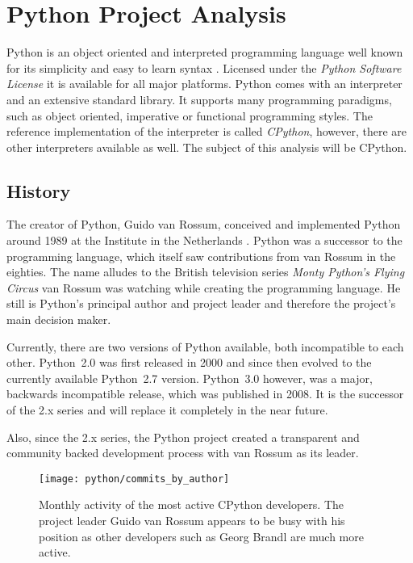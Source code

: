 \section{Python Project Analysis} %


\noindent Python is an object oriented and interpreted programming language
well known for its simplicity and easy to learn syntax \cite{PythonAbout}.
Licensed under the \emph{Python Software License} \cite{PythonLicence} it is
available for all major platforms. Python comes with an interpreter and an
extensive standard library. It supports many programming paradigms, such as
object oriented, imperative or functional programming styles. The reference
implementation of the interpreter is called \emph{CPython}, however, there are
other interpreters available as well. The subject of this analysis will be
CPython.

\subsection{History} %

The creator of Python, Guido van Rossum, conceived and implemented Python
around 1989 at the  Institute in the Netherlands
\cite{Venners2003}. Python was a successor to the  programming
language, which itself saw contributions from van Rossum in the eighties. The
name alludes to the British television series \emph{Monty Python's Flying
Circus} van Rossum was watching while creating the programming language. He
still is Python's principal author and project leader and therefore the
project's main decision maker.

Currently, there are two versions of Python available, both incompatible to
each other. Python~2.0 was first released in 2000 and since then evolved to the
currently available Python~2.7 version. Python~3.0 however, was a major,
backwards incompatible release, which was published in 2008. It is the
successor of the 2.x series and will replace it completely in the near future.

Also, since the 2.x series, the Python project created a transparent and
community backed development process with van Rossum as its leader.

\begin{figure}[htbp]
  \centering
  \texttt{[image: python/commits\_by\_author]}
  \caption[Commits by Most Active Authors, Python]
  {Monthly activity of the most active CPython developers. The project
    leader Guido van Rossum appears to be busy with his position as other
    developers such as Georg Brandl are much more active.}
  \label{fig:python:cba}
\end{figure}

